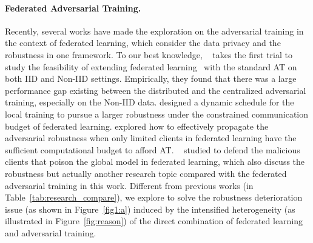 \documentclass{article} %
\theoremstyle{plain}
\theoremstyle{definition}
\theoremstyle{remark}
\begin{document}
\paragraph{Federated Adversarial Training.}
Recently, several works have made the exploration on the adversarial training in the context of federated learning, which consider the data privacy and the robustness in one framework.
To our best knowledge, ~\citet{zizzo2020fat} takes the first trial to study the feasibility of extending federated learning~\citep{mcmahan2017communication} with the standard AT on both IID and Non-IID settings. Empirically, they found that there was a large performance gap existing between the distributed and the centralized adversarial training, especially on the Non-IID data. \citet{shah2021adversarial} designed a dynamic schedule for the local training to pursue a larger robustness under the constrained communication budget of federated learning. \citet{hong2021federated} explored how to effectively propagate the adversarial robustness when only limited clients in federated learning have the sufficient computational budget to afford AT. 
~\citet{zhang2020defending,zizzo2021certified} studied to defend the malicious clients that poison the global model in federated learning, which also discuss the robustness but actually another research topic compared with the federated adversarial training in this work.
Different from previous works (in Table~\ref{tab:research_compare}), we explore to solve the robustness deterioration issue (as shown in Figure~\ref{fig1:a}) induced by the intensified heterogeneity (as illustrated in Figure~\ref{fig:reason}) of the direct combination of federated learning and adversarial training.
\end{document}
